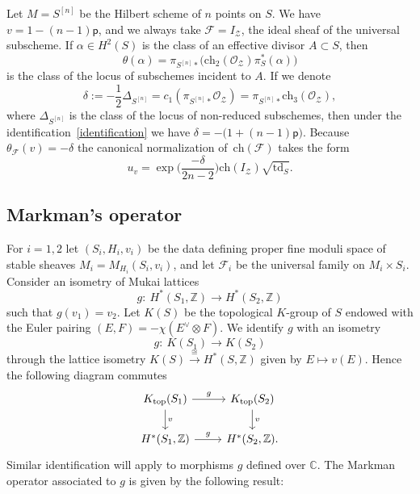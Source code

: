 \documentclass[pdftex]{sigma}
\numberwithin{equation}{section}
\newcommand{\BC}{{\mathbb{C}}}
\newcommand{\BZ}{{\mathbb{Z}}}
\newcommand{\CF}{{\mathcal F}}
\newcommand{\CO}{{\mathcal O}}
\newcommand{\CZ}{{\mathcal Z}}
\newcommand{\pt}{{\mathsf{p}}}
\newcommand{\ch}{{\mathrm{ch}}}
\newcommand{\td}{{\mathrm{td}}}
\newcommand{\1}{\mathsf{1}}
\begin{document}
\begin{Example} %
Let $M = S^{[n]}$ be the Hilbert scheme of $n$ points on $S$. We have $v=1-(n-1) \pt$,
and we always take $\CF = I_{\CZ}$, the ideal sheaf of the universal subscheme.
If $\alpha \in H^2(S)$ is the class of an effective divisor $A \subset S$, then
\[
\theta(\alpha) = \pi_{S^{[n]} \ast}\big(\ch_2(\CO_{\CZ}) \pi_S^{\ast}(\alpha)\big)
\]
is the class of the locus of subschemes incident to $A$.
If we denote
\[
\delta := -\frac{1}{2} \Delta_{S^{[n]}} = c_1( \pi_{S^{[n]} \ast} \CO_{\CZ} ) = \pi_{S^{[n]} \ast} \ch_3(\CO_{\CZ}),
\]
where $\Delta_{S^{[n]}}$ is the class of the locus of non-reduced subschemes, then
under the identification~\eqref{identification} we have
$\delta = - \big( 1 + (n-1) \pt \big)$.
Because $\theta_{\CF}(v)=-\delta$ the canonical normalization of~$\ch(\CF)$ takes the form
\[
u_v = \exp\bigg( \frac{-\delta}{2n-2} \bigg) \ch(I_{\CZ}) \sqrt{\td_S}.
\]
\end{Example}

\subsection{Markman's operator} %
For $i=1,2$ let $(S_i, H_i, v_i)$ be the data defining
proper fine moduli space of stable sheaves $M_i = M_{H_i}(S_i,v_i)$,
and let $\CF_i$ be the universal family on $M_i \times S_i$.
%
Consider an isometry of Mukai lattices
\[
g\colon\ H^{\ast}(S_1, \BZ) \to H^{\ast}(S_2, \BZ)
\]
such that $g(v_1) = v_2$.
Let $K(S)$ be the topological $K$-group of $S$ endowed with the Euler pairing $(E , F) = -\chi(E^{\vee} \otimes F)$. We identify $g$ with an isometry
\[
g\colon\ K(S_1) \to K(S_2)
\]
through the lattice isometry
$K(S) \xrightarrow{\cong} H^{\ast}(S,\BZ)$ given by $E \mapsto v(E)$.
Hence the following diagram commutes
\[
\begin{tikzcd}
K_{\mathrm{top}}(S_1) \ar{r}{g} \ar{d}{v} & K_{\mathrm{top}}(S_2) \ar{d}{v} \\
H^{\ast}(S_1, \BZ) \ar{r}{g} & H^{\ast}(S_2, \BZ).
\end{tikzcd}
\]
Similar identification will apply to morphisms $g$ defined over $\BC$.
The Markman operator associated to $g$ is given by the following result:
\end{document}
